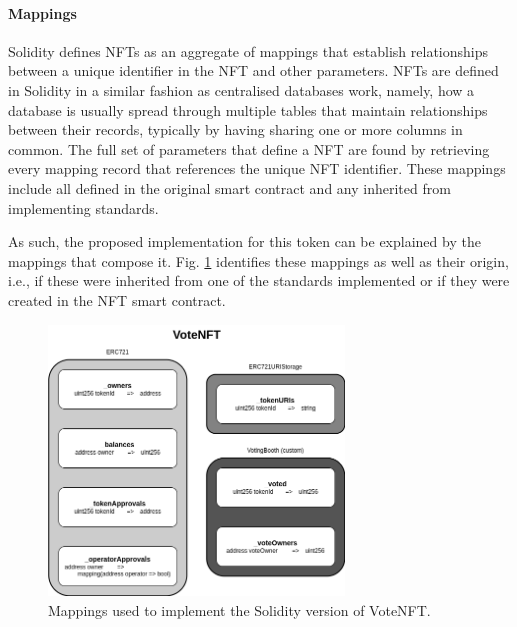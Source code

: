 \documentclass[../main.tex]{subfiles}
\begin{document}
\paragraph{Mappings}
\label{sec:mappings}
Solidity defines NFTs as an aggregate of mappings that establish relationships between a unique identifier in the NFT and other parameters. NFTs are defined in Solidity in a similar fashion as centralised databases work, namely, how a  database is usually spread through multiple tables that maintain relationships between their records, typically by having sharing one or more columns in common. The full set of parameters that define a NFT are found by retrieving every mapping record that references the unique NFT identifier. These mappings include all defined in the original smart contract and any inherited from implementing standards.
\par
As such, the proposed implementation for this token can be explained by the mappings that compose it. Fig. \ref{fig:votenft_mappings} identifies these mappings as well as their origin, i.e., if these were inherited from one of the standards implemented or if they were created in the NFT smart contract.

\begin{figure}[htp]
    \centering
    \includegraphics[width=0.7\textwidth]{../Images/01_VoteNFT_Mappings.png}
    \caption{Mappings used to implement the Solidity version of VoteNFT.}
    \label{fig:votenft_mappings}
\end{figure}
\end{document}
